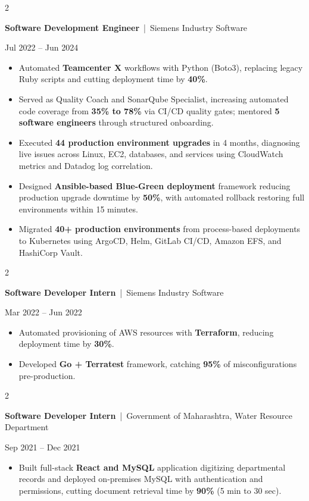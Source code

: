 \documentclass[10pt, letterpaper]{article}
\newenvironment{highlights}{
    \begin{itemize}[
        topsep=0.10 cm,
        parsep=0.06 cm,
        partopsep=0pt,
        itemsep=0.06 cm,
        leftmargin=12pt
    ]
}{
    \end{itemize}
}
\newenvironment{twocolentry}[2][]{
    \onecolentry
    \def\secondColumn{#2}
    \setcolumnwidth{\fill, 4.5 cm}
    \begin{paracol}{2}
}{
    \switchcolumn \raggedleft \secondColumn
    \end{paracol}
    \endonecolentry
}
\begin{document}
\vspace{0.15 cm}

\begin{twocolentry}{Jul 2022 -- Jun 2024}
\textbf{Software Development Engineer} \,|\, Siemens Industry Software
\end{twocolentry}
\begin{highlights}
  \item Automated \textbf{Teamcenter X} workflows with Python (Boto3), replacing legacy Ruby scripts and cutting deployment time by \textbf{40\%}.
  \item Served as Quality Coach and SonarQube Specialist, increasing automated code coverage from \textbf{35\% to 78\%} via CI/CD quality gates; mentored \textbf{5 software engineers} through structured onboarding.
  \item Executed \textbf{44 production environment upgrades} in 4 months, diagnosing live issues across Linux, EC2, databases, and services using CloudWatch metrics and Datadog log correlation.
  \item Designed \textbf{Ansible-based Blue-Green deployment} framework reducing production upgrade downtime by \textbf{50\%}, with automated rollback restoring full environments within 15 minutes.
  \item Migrated \textbf{40+ production environments} from process-based deployments to Kubernetes using ArgoCD, Helm, GitLab CI/CD, Amazon EFS, and HashiCorp Vault.
\end{highlights}

\vspace{0.15 cm}

\begin{twocolentry}{Mar 2022 -- Jun 2022}
\textbf{Software Developer Intern} \,|\, Siemens Industry Software
\end{twocolentry}
\begin{highlights}
  \item Automated provisioning of AWS resources with \textbf{Terraform}, reducing deployment time by \textbf{30\%}.
  \item Developed \textbf{Go + Terratest} framework, catching \textbf{95\%} of misconfigurations pre-production.
\end{highlights}

\vspace{0.15 cm}

\begin{twocolentry}{Sep 2021 -- Dec 2021}
\textbf{Software Developer Intern} \,|\, Government of Maharashtra, Water Resource Department
\end{twocolentry}
\begin{highlights}
  \item Built full-stack \textbf{React and MySQL} application digitizing departmental records and deployed on-premises MySQL with authentication and permissions, cutting document retrieval time by \textbf{90\%} (5 min to 30 sec).
\end{highlights}
\end{document}
